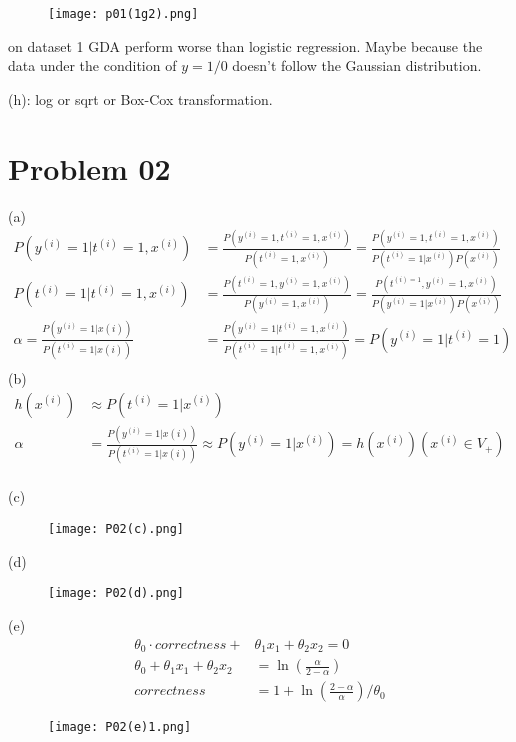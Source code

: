 \documentclass{article}
\begin{document}
\begin{figure}[H]
    \centering
    \texttt{[image: p01(1g2).png]}
\end{figure}

on dataset 1 GDA perform worse than logistic regression. Maybe because the data under the condition of $y=1/0$ doesn't follow the Gaussian distribution.

(h):
log or sqrt or Box-Cox transformation.

\section{Problem 02}
(a)
\begin{align*}
    P(y^{(i)}=1|t^{(i)}=1,x^{(i)})&=\frac{P(y^{(i)}=1,t^(i)=1,x^(i))}{P(t^{(i)}=1,x^{(i)})}=\frac{P(y^{(i)}=1,t^(i)=1,x^(i))}{P(t^{(i)}=1|x^{(i)})P(x^{(i)})}\\
    P(t^{(i)}=1|t^{(i)}=1,x^{(i)})&=\frac{P(t^{(i)}=1,y^(i)=1,x^(i))}{P(y^{(i)}=1,x^{(i)})}=\frac{P(t^{(i)=1},y^(i)=1,x^(i))}{P(y^{(i)}=1|x^{(i)})P(x^{(i)})}\\
    \alpha=\frac{P(y^{(i)}=1|x(i))}{P(t^{(i)}=1|x(i))}&=\frac{P(y^{(i)}=1|t^{(i)}=1,x^{(i)})}{P(t^{(i)}=1|t^{(i)}=1,x^{(i)})}=P(y^{(i)}=1|t^{(i)}=1)\\
\end{align*}
(b)
\begin{align*}
    h(x^{(i)})&\approx P(t^{(i)}=1|x^{(i)})\\
    \alpha&=\frac{P(y^{(i)}=1|x(i))}{P(t^{(i)}=1|x(i))}\approx P(y^{(i)}=1|x^{(i)}) = h(x^{(i)}) (x^{(i)}\in V_+)\\
\end{align*}

(c)
\begin{figure}[H]
    \centering
    \texttt{[image: P02(c).png]}
\end{figure}

(d)
\begin{figure}[H]
    \centering
    \texttt{[image: P02(d).png]}
\end{figure}

(e)
\begin{align*}
    \theta_0 \cdot correctness+&\theta_1x_1+\theta_2x_2=0\\
    \theta_0+\theta_1x_1+\theta_2x_2&=\ln(\frac{\alpha}{2-\alpha})\\
    correctness&=1+\ln(\frac{2-\alpha}{\alpha})/\theta_0
\end{align*}
\begin{figure}[H]
    \centering
    \texttt{[image: P02(e)1.png]}
\end{figure}
\end{document}
